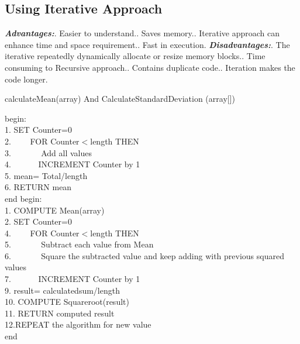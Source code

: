 \documentclass[a4paper,12pt]{article}
\begin{document}
\begin{titlepage}
\subsection{Using Iterative Approach}
\textbf{\textit{Advantages:}}. Easier to understand.. Saves memory.. Iterative approach can enhance time and space requirement.. Fast in execution.\newline
\newline
\textbf{\textit{Disadvantages:}}. The iterative repeatedly dynamically allocate or resize memory blocks.. Time consuming to Recursive approach.. Contains duplicate code.. Iteration makes the code longer.\newline
\begin{algorithm}
\caption{calculateMean(array) And CalculateStandardDeviation (array[])}
\label{Algorithm 1:}
begin: \\
1. SET Counter=0\\
2. $\hspace{2em}$FOR Counter$<$length THEN\\
3. $\hspace{3em}$ Add all values\\
4. $\hspace{3em}$INCREMENT Counter by 1 \\
5. mean= Total/length \\
6. RETURN mean\\
end\newline
begin: \\
1. COMPUTE Mean(array)\\
2. SET Counter=0\\
4. $\hspace{2em}$FOR Counter$<$length THEN\\
5. $\hspace{3em}$ Subtract each value from Mean\\
6. $\hspace{3em}$ Square the subtracted value and keep adding     with previous squared values\\
7. $\hspace{3em}$INCREMENT Counter by 1 \\
9. result= calculatedsum/length \\
10. COMPUTE Squareroot(result)\\
11. RETURN computed result \\
12.REPEAT the algorithm for new value  \\
end
\end{algorithm}
\newpage

\end{titlepage}
\end{document}

